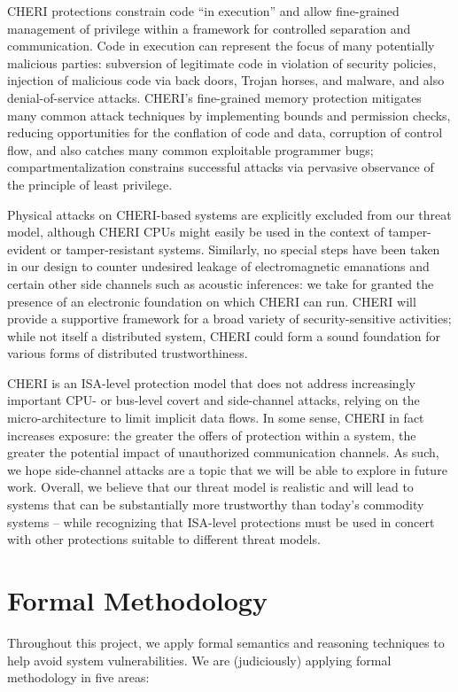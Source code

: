 CHERI protections constrain code ``in execution'' and allow fine-grained management
of privilege within a framework for controlled separation and communication.
Code in execution can represent the focus of many potentially malicious parties:
subversion of legitimate code in violation of security policies, injection of malicious
code via back doors, Trojan horses, and malware, and also
denial-of-service attacks.
CHERI's fine-grained memory protection mitigates
many common attack techniques by implementing bounds and permission checks,
reducing opportunities for the conflation of code and data, corruption of
control flow, and also catches many common exploitable programmer bugs;
compartmentalization constrains successful attacks via pervasive observance of
the principle of least privilege.

Physical attacks on CHERI-based systems are explicitly excluded from our threat model,
although CHERI CPUs might easily be used in the context of tamper-evident or
tamper-resistant systems.
Similarly, no special steps have been taken in our design to counter undesired
leakage of electromagnetic emanations and certain other side channels such as acoustic inferences:
we take for granted the presence of an
electronic foundation on which CHERI can run.
CHERI will provide a supportive framework for a broad variety of security-sensitive
activities; while not itself a distributed system, CHERI could form a sound foundation for various forms of distributed trustworthiness.

CHERI is an ISA-level protection model that does not address increasingly
important CPU- or bus-level covert and side-channel attacks, relying on the
micro-architecture to limit implicit data flows.
In some sense, CHERI in fact increases exposure: the greater the offers of
protection within a system, the greater the potential impact of unauthorized
communication channels.
As such, we hope side-channel attacks are a topic that we will be able to
explore in future work.
Overall, we believe that our threat model is realistic and will
lead to systems that can be substantially more trustworthy than
today's commodity systems -- while recognizing that ISA-level protections must
be used in concert with other protections suitable to different threat models.

\section{Formal Methodology}

Throughout this project, we apply formal semantics and reasoning techniques to help avoid
system vulnerabilities.
We are (judiciously) applying formal methodology in
five areas:

